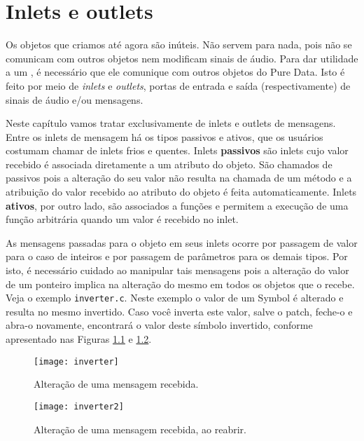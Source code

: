 
\chapter{Inlets e outlets}

Os objetos que criamos até agora são inúteis.
Não servem para nada, pois não se comunicam com outros objetos nem modificam
sinais de áudio.
Para dar utilidade a um \external, é necessário que ele comunique com outros objetos
do Pure Data.
Isto é feito por meio de \emph{inlets} e \emph{outlets}, portas
de entrada e saída (respectivamente) de sinais de áudio e/ou mensagens.

Neste capítulo vamos tratar exclusivamente de inlets e outlets de mensagens.
Entre os inlets de mensagem há os tipos passivos e ativos, que os usuários
costumam chamar de inlets frios e quentes.
Inlets \textbf{passivos} são inlets cujo valor recebido é associada diretamente
a um atributo do objeto.
São chamados de passivos pois a alteração do seu valor não resulta na chamada
de um método e a atribuição do valor recebido ao atributo do objeto é feita
automaticamente.
Inlets \textbf{ativos}, por outro lado, são associados a
funções e permitem a execução de uma função arbitrária quando um valor é
recebido no inlet.

As mensagens passadas para o objeto em seus inlets ocorre por passagem de valor
para o caso de inteiros e por passagem de parâmetros para os demais tipos.
Por isto, é necessário cuidado ao manipular tais mensagens pois a alteração do
valor de um ponteiro implica na alteração do mesmo em todos os objetos que o
recebe.
Veja o exemplo \texttt{inverter.c}.
Neste exemplo o valor de um Symbol é alterado e resulta no mesmo invertido.
Caso você inverta este valor, salve o patch, feche-o e abra-o novamente, encontrará o
valor deste símbolo invertido, conforme apresentado nas Figuras \ref{fig:inverter} e
\ref{fig:inverter2}.

\begin{figure}[h!]
\centering
\texttt{[image: inverter]}
\caption{Alteração de uma mensagem recebida.}
\label{fig:inverter}
\end{figure}

\begin{figure}[h!]
\centering
\texttt{[image: inverter2]}
\caption{Alteração de uma mensagem recebida, ao reabrir.}
\label{fig:inverter2}
\end{figure}


